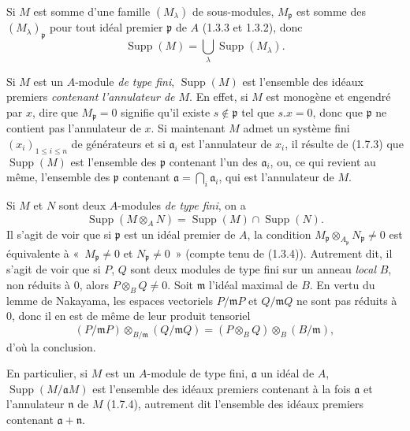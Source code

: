 \begin{env}[1.7.3]
\label{0.1.7.3-fr}
Si $M$ est somme d'une famille $(M_\lambda)$ de sous-modules,
$M_{\mathfrak p}$ est somme des $(M_\lambda)_{\mathfrak p}$ pour tout idéal
premier $\mathfrak p$ de $A$ (1.3.3 et 1.3.2), donc
\[
  \operatorname{Supp}(M)=\bigcup_\lambda\operatorname{Supp}(M_\lambda).
\]
\end{env}

\begin{env}[1.7.4]
\label{0.1.7.4-fr}
Si $M$ est un $A$-module \emph{de type fini}, $\operatorname{Supp}(M)$ est
l'ensemble des idéaux premiers \emph{contenant l'annulateur de $M$}. En effet,
si $M$ est monogène et engendré par $x$, dire que $M_{\mathfrak p}=0$ signifie
qu'il existe $s\notin\mathfrak p$ tel que $s.x=0$, donc que $\mathfrak p$ ne
contient pas l'annulateur de $x$. Si maintenant $M$ admet un système fini
$(x_i)_{1\leq i\leq n}$ de générateurs et si $\mathfrak a_i$ est l'annulateur
de $x_i$, il résulte de (1.7.3) que $\operatorname{Supp}(M)$ est l'ensemble des
$\mathfrak p$ contenant l'un des $\mathfrak a_i$, ou, ce qui revient au même,
l'ensemble des $\mathfrak p$ contenant $\mathfrak a=\bigcap_i\mathfrak a_i$,
qui est l'annulateur de $M$.
\end{env}

\begin{env}[1.7.5]
\label{0.1.7.5-fr}
Si $M$ et $N$ sont deux $A$-modules \emph{de type fini}, on a
\[
  \operatorname{Supp}(M\otimes_A N)
  =\operatorname{Supp}(M)\cap\operatorname{Supp}(N).
\]
Il s'agit de voir que si $\mathfrak p$ est un idéal premier de $A$, la
condition $M_{\mathfrak p}\otimes_{A_{\mathfrak p}}N_{\mathfrak p}\neq0$ est
équivalente à «~$M_{\mathfrak p}\neq0$ et $N_{\mathfrak p}\neq0$~» (compte
tenu de (1.3.4)). Autrement dit, il s'agit de voir que si $P$, $Q$ sont deux
modules de type fini sur un anneau \emph{local} $B$, non réduits à $0$, alors
$P\otimes_B Q\neq0$. Soit $\mathfrak m$ l'idéal maximal de $B$. En vertu du
lemme de Nakayama, les espaces vectoriels $P/\mathfrak mP$ et
$Q/\mathfrak mQ$ ne sont pas réduits à $0$, donc il en est de même de leur
produit tensoriel
\[
  (P/\mathfrak mP)\otimes_{B/\mathfrak m}(Q/\mathfrak mQ)
  =(P\otimes_B Q)\otimes_B(B/\mathfrak m),
\]
d'où la conclusion.

En particulier, si $M$ est un $A$-module de type fini, $\mathfrak a$ un idéal
de $A$, $\operatorname{Supp}(M/\mathfrak aM)$ est l'ensemble des idéaux
premiers contenant à la fois $\mathfrak a$ et l'annulateur $\mathfrak n$ de
$M$ (1.7.4), autrement dit l'ensemble des idéaux premiers contenant
$\mathfrak a+\mathfrak n$.
\end{env}

